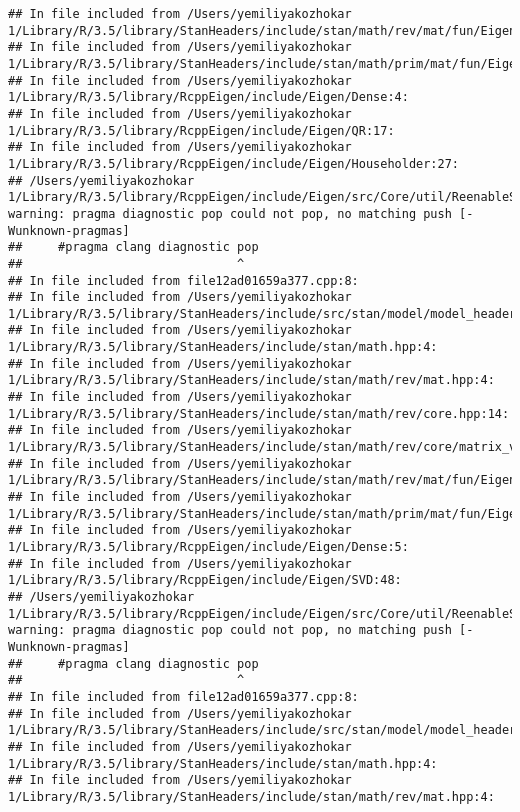 \documentclass[]{article}
\begin{document}
\begin{verbatim}
## In file included from /Users/yemiliyakozhokar 1/Library/R/3.5/library/StanHeaders/include/stan/math/rev/mat/fun/Eigen_NumTraits.hpp:4:
## In file included from /Users/yemiliyakozhokar 1/Library/R/3.5/library/StanHeaders/include/stan/math/prim/mat/fun/Eigen.hpp:4:
## In file included from /Users/yemiliyakozhokar 1/Library/R/3.5/library/RcppEigen/include/Eigen/Dense:4:
## In file included from /Users/yemiliyakozhokar 1/Library/R/3.5/library/RcppEigen/include/Eigen/QR:17:
## In file included from /Users/yemiliyakozhokar 1/Library/R/3.5/library/RcppEigen/include/Eigen/Householder:27:
## /Users/yemiliyakozhokar 1/Library/R/3.5/library/RcppEigen/include/Eigen/src/Core/util/ReenableStupidWarnings.h:10:30: warning: pragma diagnostic pop could not pop, no matching push [-Wunknown-pragmas]
##     #pragma clang diagnostic pop
##                              ^
## In file included from file12ad01659a377.cpp:8:
## In file included from /Users/yemiliyakozhokar 1/Library/R/3.5/library/StanHeaders/include/src/stan/model/model_header.hpp:4:
## In file included from /Users/yemiliyakozhokar 1/Library/R/3.5/library/StanHeaders/include/stan/math.hpp:4:
## In file included from /Users/yemiliyakozhokar 1/Library/R/3.5/library/StanHeaders/include/stan/math/rev/mat.hpp:4:
## In file included from /Users/yemiliyakozhokar 1/Library/R/3.5/library/StanHeaders/include/stan/math/rev/core.hpp:14:
## In file included from /Users/yemiliyakozhokar 1/Library/R/3.5/library/StanHeaders/include/stan/math/rev/core/matrix_vari.hpp:4:
## In file included from /Users/yemiliyakozhokar 1/Library/R/3.5/library/StanHeaders/include/stan/math/rev/mat/fun/Eigen_NumTraits.hpp:4:
## In file included from /Users/yemiliyakozhokar 1/Library/R/3.5/library/StanHeaders/include/stan/math/prim/mat/fun/Eigen.hpp:4:
## In file included from /Users/yemiliyakozhokar 1/Library/R/3.5/library/RcppEigen/include/Eigen/Dense:5:
## In file included from /Users/yemiliyakozhokar 1/Library/R/3.5/library/RcppEigen/include/Eigen/SVD:48:
## /Users/yemiliyakozhokar 1/Library/R/3.5/library/RcppEigen/include/Eigen/src/Core/util/ReenableStupidWarnings.h:10:30: warning: pragma diagnostic pop could not pop, no matching push [-Wunknown-pragmas]
##     #pragma clang diagnostic pop
##                              ^
## In file included from file12ad01659a377.cpp:8:
## In file included from /Users/yemiliyakozhokar 1/Library/R/3.5/library/StanHeaders/include/src/stan/model/model_header.hpp:4:
## In file included from /Users/yemiliyakozhokar 1/Library/R/3.5/library/StanHeaders/include/stan/math.hpp:4:
## In file included from /Users/yemiliyakozhokar 1/Library/R/3.5/library/StanHeaders/include/stan/math/rev/mat.hpp:4:

\end{verbatim}
\end{document}
